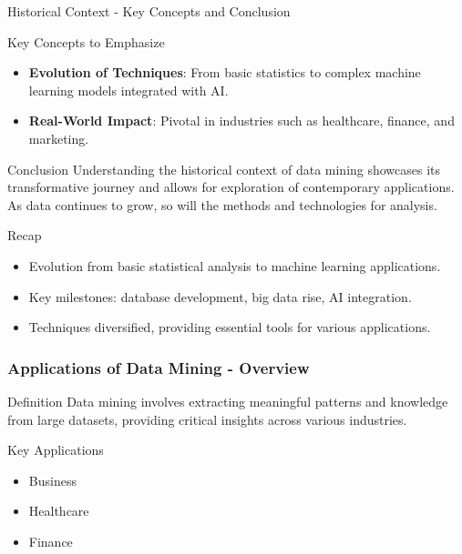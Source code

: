 \documentclass[aspectratio=169]{beamer}
\begin{document}
\begin{frame}[fragile]{Historical Context - Key Concepts and Conclusion}
    \begin{block}{Key Concepts to Emphasize}
        \begin{itemize}
            \item \textbf{Evolution of Techniques}: From basic statistics to complex machine learning models integrated with AI.
            \item \textbf{Real-World Impact}: Pivotal in industries such as healthcare, finance, and marketing.
        \end{itemize}
    \end{block}

    \begin{block}{Conclusion}
        Understanding the historical context of data mining showcases its transformative journey and allows for exploration of contemporary applications. As data continues to grow, so will the methods and technologies for analysis.
    \end{block}

    \begin{block}{Recap}
        \begin{itemize}
            \item Evolution from basic statistical analysis to machine learning applications.
            \item Key milestones: database development, big data rise, AI integration.
            \item Techniques diversified, providing essential tools for various applications.
        \end{itemize}
    \end{block}
\end{frame}

\begin{frame}[fragile]
    \frametitle{Applications of Data Mining - Overview}
    \begin{block}{Definition}
        Data mining involves extracting meaningful patterns and knowledge from large datasets, providing critical insights across various industries.
    \end{block}
    
    \begin{block}{Key Applications}
        \begin{itemize}
            \item Business
            \item Healthcare
            \item Finance
        \end{itemize}
    \end{block}
\end{frame}
\end{document}
